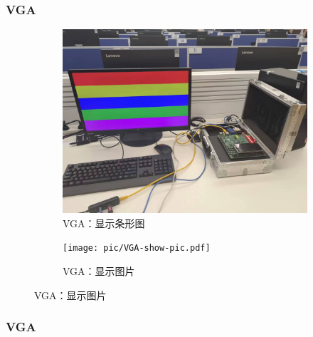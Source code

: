 \documentclass{beamer}
\begin{document}
\begin{frame}
    \frametitle{VGA}

    \begin{figure}
        \centering
        \begin{subfigure}{.45\textwidth}
            \centering
            \includegraphics[height=.7\textwidth]{pic/strip-pic.pdf}
            \caption{VGA：显示条形图}
        \end{subfigure}
        \begin{subfigure}{.45\textwidth}
            \centering
            \texttt{[image: pic/VGA-show-pic.pdf]}
            \caption{VGA：显示图片}
        \end{subfigure}
    \end{figure}

\end{frame}

\begin{frame}
    \frametitle{VGA}
\end{frame}
\end{document}
